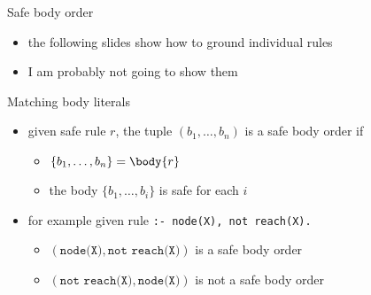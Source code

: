 \begin{frame}{Safe body order}
  \bigskip
  \begin{itemize}
    \item the following slides show how to ground individual rules
    \item I am probably not going to show them
  \end{itemize}
\end{frame}
\begin{frame}{Matching body literals}
  \begin{itemize}
    \item given safe rule \(r\), the tuple \((b_1, \dots, b_n)\) is a \alert{safe body order} if
      \begin{itemize}
        \item \(\{ b_1 ,\dots , b_n \} = \body{r} \)
        \item the body \(\{b_1, \dots, b_i\}\) is safe for each \(i\)
      \end{itemize}
      \pause
    \item for \alert{example} given rule \texttt{:- node(X), not reach(X).}
      \begin{itemize}
        \item \((\texttt{node(X)}, \texttt{not reach(X)})\) is a safe body order
        \item \((\texttt{not reach(X)}, \texttt{node(X)})\) is not a safe body order
      \end{itemize}
  \end{itemize}
\end{frame}

